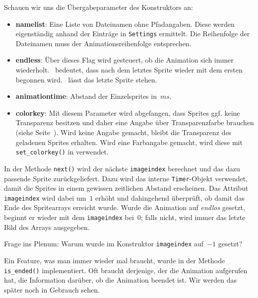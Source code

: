 Schauen wir uns die Übergabeparameter des Konstruktors an: 
\begin{itemize}
    \item \textbf{namelist}: Eine Liste von Dateinamen ohne Pfadangaben. Diese werden eigenständig anhand der Einträge in \texttt{Settings} ermittelt. Die Reihenfolge der Dateinamen muss der Animationsreihenfolge entsprechen.

    \item \textbf{endless}: Über dieses Flag wird gesteuert, ob die Animation sich immer wiederholt. \true\ bedeutet, dass nach dem letztes Sprite wieder mit dem ersten begonnen wird. \false\ lässt das letzte Sprite stehen.

    \item \textbf{animationtime}: Abstand der Einzelsprites in~$ms$.

    \item \textbf{colorkey}: Mit diesem Parameter wird abgefangen, dass Sprites ggf. keine Transparenz besitzen und daher eine Angabe über Transparenzfarbe brauchen (siehe Seite~\pageref{pageTransparenz}). Wird keine Angabe gemacht, bleibt die Transparenz des geladenen Sprites erhalten. Wird eine Farbangabe gemacht, wird diese mit \texttt{set\_colorkey()} in  verwendet.
\end{itemize}

In der Methode \texttt{next()} wird der nächste \texttt{imageindex} berechnet und das dazu passende Sprite zurückgeliefert. Dazu wird das interne \texttt{Timer}-Objekt verwendet, damit die Sprites in einem gewissen zeitlichen Abstand erscheinen. Das Attribut \texttt{imageindex} wird dabei um~$1$ erhöht und dahingehend überprüft, ob damit das Ende des Spritearrays erreicht wurde. Wurde die Animation auf \emph{endlos} gesetzt, beginnt er wieder mit dem \texttt{imageindex} bei~$0$; falls nicht, wird immer das letzte Bild des Arrays ausgegeben.

Frage ins Plenum: Warum wurde im Konstruktor \texttt{imageindex} auf~$-1$ gesetzt?

Ein Feature, was man immer wieder mal braucht, wurde in der Methode \texttt{is\_ended()} implementiert. Oft braucht derjenige, der die Animation aufgerufen hat, die Information darüber, ob die Animation beendet ist. Wir werden das später noch in Gebrauch sehen.


